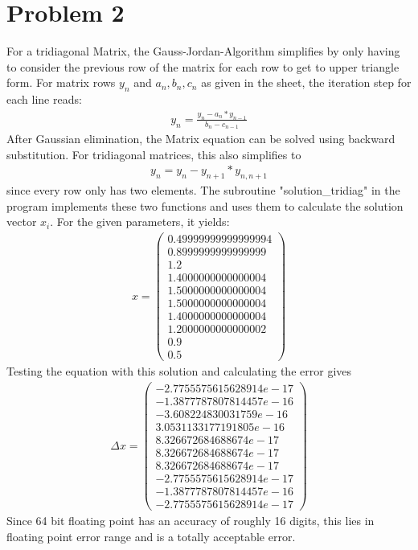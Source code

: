 \documentclass[12pt, a4paper]{article}
\begin{document}
  \section*{Problem 2}
  For a tridiagonal Matrix, the Gauss-Jordan-Algorithm simplifies by only having to consider the previous row of the matrix for each row to get to upper triangle form. For matrix rows $y_n$ and $a_n,b_n,c_n$ as given in the sheet, the iteration step for each line reads:
  \begin{align}
  	y_n=\frac{y_n-a_n*y_{n-1}}{ b_n-c_{n-1}}
  \end{align}
  After Gaussian elimination, the Matrix equation can be solved using backward substitution. For tridiagonal matrices, this also simplifies to
  \begin{align}
  	y_n=y_n-y_{n+1}*y_{n,n+1}
  \end{align}
  since every row only has two elements. The subroutine "solution\_tridiag" in the program implements these two functions and uses them to calculate the solution vector $x_i$. For the given parameters, it yields:
  \begin{align}
  	x=\begin{pmatrix}
  	0.49999999999999994\\0.8999999999999999\\1.2\\1.4000000000000004\\1.5000000000000004\\1.5000000000000004\\1.4000000000000004\\1.2000000000000002\\0.9\\0.5 
  	\end{pmatrix}
  \end{align}
  Testing the equation with this solution and calculating the error gives
  \begin{align}
   \Delta x=\begin{pmatrix}
  -2.7755575615628914e-17\\-1.3877787807814457e-16\\-3.608224830031759e-16\\3.0531133177191805e-16\\8.326672684688674e-17\\8.326672684688674e-17\\8.326672684688674e-17\\-2.7755575615628914e-17\\-1.3877787807814457e-16\\-2.7755575615628914e-17
    \end{pmatrix}
  \end{align}
  Since 64 bit floating point has an accuracy of roughly 16 digits, this lies in floating point error range and is a totally acceptable error.
\end{document}
